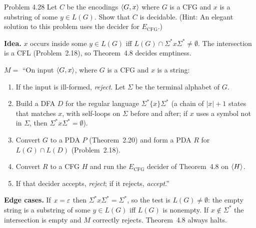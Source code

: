 \begin{question}{Problem 4.28}
Let $C$ be the encodings $\langle G,x\rangle$ where $G$ is a CFG and $x$ is a substring of some $y\in L(G)$. Show that $C$ is decidable. (Hint: An elegant solution to this problem uses the decider for $E_{\mathrm{CFG}}$.)
\end{question}
\begin{soln}
\textbf{Idea.} $x$ occurs inside some $y\in L(G)$ iff $L(G)\cap\Sigma^*x\Sigma^*\neq\emptyset$. The intersection is a CFL (Problem~2.18), so Theorem~4.8 decides emptiness.

$M=$ ``On input $\langle G,x\rangle$, where $G$ is a CFG and $x$ is a string:
\begin{enumerate}
\item If the input is ill-formed, \emph{reject}. Let $\Sigma$ be the terminal alphabet of $G$.
\item Build a DFA $D$ for the regular language $\Sigma^*\{x\}\Sigma^*$ (a chain of $|x|+1$ states that matches $x$, with self-loops on $\Sigma$ before and after; if $x$ uses a symbol not in $\Sigma$, then $\Sigma^*x\Sigma^*=\emptyset$).
\item Convert $G$ to a PDA $P$ (Theorem~2.20) and form a PDA $R$ for $L(G)\cap L(D)$ (Problem~2.18).
\item Convert $R$ to a CFG $H$ and run the $E_{\mathrm{CFG}}$ decider of Theorem~4.8 on $\langle H\rangle$.
\item If that decider accepts, \emph{reject}; if it rejects, \emph{accept}.''
\end{enumerate}

\textbf{Edge cases.} If $x=\varepsilon$ then $\Sigma^*x\Sigma^*=\Sigma^*$, so the test is $L(G)\neq\emptyset$: the empty string is a substring of some $y\in L(G)$ iff $L(G)$ is nonempty. If $x\notin\Sigma^*$ the intersection is empty and $M$ correctly rejects. Theorem~4.8 always halts.
\end{soln}

